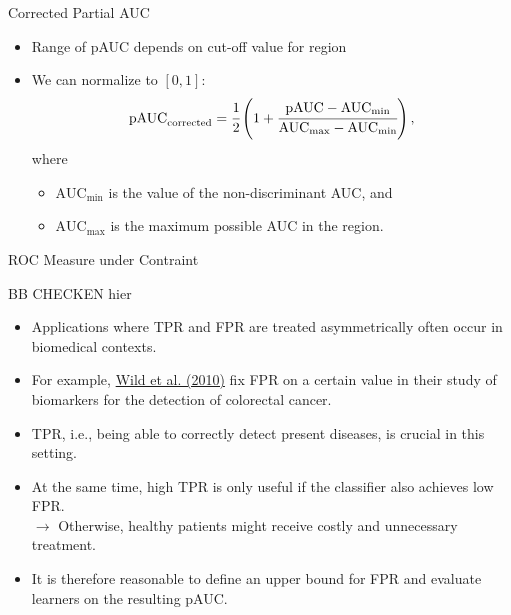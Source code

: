 \begin{vbframe}{Corrected Partial AUC}

\begin{itemize}
  \item Range of pAUC depends on cut-off value for region 
  \item We can normalize to $[0, 1]$:
  $$\text{pAUC}_\text{corrected} = \cfrac{1}{2} \left( 1 + \cfrac{\text{pAUC} - 
  \text{AUC}_{\text{min}}}{\text{AUC}_{\text{max}} - \text{AUC}_{\text{min}}} 
  \right),$$
  where
  \begin{itemize}
    \item $\text{AUC}_{\text{min}}$ is the value of the non-discriminant AUC, 
    and
    \item $\text{AUC}_{\text{max}}$ is the maximum possible AUC in the region.
  \end{itemize}

\end{itemize}

\end{vbframe}


\begin{vbframe}{ROC Measure under Contraint}

BB CHECKEN hier

\begin{itemize}
  \item Applications where TPR and FPR are treated 
  asymmetrically often occur in biomedical contexts.
  \item For example, 
  \href{https://clincancerres.aacrjournals.org/content/16/24/6111}
  {Wild et al. (2010)} fix FPR on a certain value in their study of biomarkers for the detection 
  of colorectal cancer.
  \item TPR, i.e., being able to correctly detect present diseases, is 
  crucial in this setting.
  \item At the same time, high TPR is only useful if the classifier also 
  achieves low FPR. \\
  $\rightarrow$ Otherwise, healthy patients might receive costly and unnecessary treatment.
  \item It is therefore reasonable to define an upper bound for FPR and 
  evaluate learners on the resulting pAUC.
\end{itemize}

\end{vbframe}

